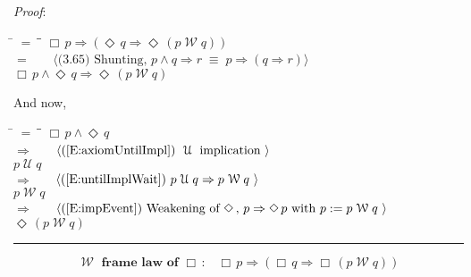 \documentclass[12pt, fleqn, leqno]{article}
\newcommand{\lgap}{2pt}                             %
\newcommand{\mymathindent}{24pt}                    %
\newcommand{\equivs}{\ensuremath{\;\equiv\;}}       %
\newcommand{\impl}{\ensuremath{\Rightarrow}}        %
\newcommand{\Until}{\;\mathcal{U}\;}
\newcommand{\Wait}{\;\mathcal{W}\;}
\newcommand{\Event}{\Diamond\,}
\newcommand{\Always}{\Box\,}
\newcommand{\myqed}{\rule[-.23ex]{1.2ex}{2.0ex}}
\newcommand{\myqedtab}{\hspace{384pt}}              %
\newcommand{\Gll} {\langle}                         %
\newcommand{\Ggg} {\rangle}                         %
\newcommand{\Hint}[1]     {\ \ \ $\Gll              \mbox{#1} \Ggg$ }   %
\begin{document}
\emph{Proof}:
\begin{tabbing}
\hspace{\mymathindent} \= $= \;$ \= \myqedtab \= \kill
  \> \>   $\Always p \impl (\Event q \impl \Event (p \Wait q))$\\[\lgap]
  \> $=$  \>  \Hint{(3.65) Shunting, $p\land q\impl r\equivs p\impl (q\impl r)$}\\[\lgap]
  \> \>   $\Always p \land \Event q \impl \Event (p \Wait q)$
\end{tabbing}
And now,
\begin{tabbing}
\hspace{\mymathindent} \= $= \;$ \= \myqedtab \= \kill
  \> \>   $\Always p \land \Event q $\\[\lgap]
   \> $\impl$ \> \Hint{(\ref{E:axiomUntilImpl}) $\Until$ implication } \\[\lgap]
   \> \>   $p \Until q $\\[\lgap]
   \> $\impl$ \> \Hint{(\ref{E:untilImplWait}) $p\Until q\impl p\Wait q$ } \\[\lgap]
   \> \>   $p \Wait q $\\[\lgap]
  \> $\impl$  \>  \Hint{(\ref{E:impEvent}) Weakening of $\Event$, $p \impl \Event p$ with $p := p \Wait q$ }\\[\lgap]
  \> \>   $\Event (p \Wait q) $\quad \myqed
\end{tabbing}
\begin{equation}\label{E:waitframelawAlways}
\textbf{$\Wait$ frame law of $\Always$:}\quad \Always p \impl (\Always q \impl \Always (p \Wait q))
\end{equation}
\end{document}
